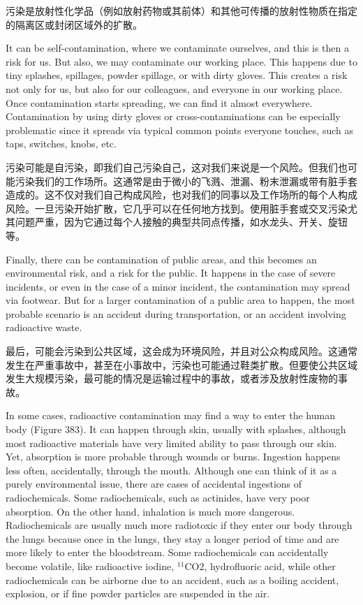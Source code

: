 \documentclass[dvipsnames, svgnames,a4paper,11pt]{article}
\begin{document}
污染是放射性化学品（例如放射药物或其前体）和其他可传播的放射性物质在指定的隔离区或封闭区域外的扩散。

It can be self-contamination, where we contaminate ourselves, and this is then a risk for us. But also, we may contaminate our working place. This happens due to tiny splashes, spillages, powder spillage, or with dirty gloves. This creates a risk not only for us, but also for our colleagues, and everyone in our working place. Once contamination starts spreading, we can find it almost everywhere. Contamination by using dirty gloves or cross-contaminations can be especially problematic since it spreads via typical common points everyone touches, such as taps, switches, knobs, etc.

污染可能是自污染，即我们自己污染自己，这对我们来说是一个风险。但我们也可能污染我们的工作场所。这通常是由于微小的飞溅、泄漏、粉末泄漏或带有脏手套造成的。这不仅对我们自己构成风险，也对我们的同事以及工作场所的每个人构成风险。一旦污染开始扩散，它几乎可以在任何地方找到。使用脏手套或交叉污染尤其问题严重，因为它通过每个人接触的典型共同点传播，如水龙头、开关、旋钮等。

Finally, there can be contamination of public areas, and this becomes an environmental risk, and a risk for the public. It happens in the case of severe incidents, or even in the case of a minor incident, the contamination may spread via footwear. But for a larger contamination of a public area to happen, the most probable scenario is an accident during transportation, or an accident involving radioactive waste.


最后，可能会污染到公共区域，这会成为环境风险，并且对公众构成风险。这通常发生在严重事故中，甚至在小事故中，污染也可能通过鞋类扩散。但要使公共区域发生大规模污染，最可能的情况是运输过程中的事故，或者涉及放射性废物的事故。

In some cases, radioactive contamination may find a way to enter the human body (Figure 383). It can happen through skin, usually with splashes, although most radioactive materials have very limited ability to pass through our skin. Yet, absorption is more probable through wounds or burns. Ingestion happens less often, accidentally, through the mouth. Although one can think of it as a purely environmental issue, there are cases of accidental ingestions of radiochemicals. Some radiochemicals, such as actinides, have very poor absorption. On the other hand, inhalation is much more dangerous. Radiochemicals are usually much more radiotoxic if they enter our body through the lungs because once in the lungs, they stay a longer period of time and are more likely to enter the bloodstream. Some radiochemicals can accidentally become volatile, like radioactive iodine, \(\mathrm{^{11}C}\)O2, hydrofluoric acid, while other radiochemicals can be airborne due to an accident, such as a boiling accident, explosion, or if fine powder particles are suspended in the air.
\end{document}
